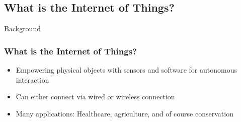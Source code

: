 \documentclass{beamer}
\begin{document}
\subsection{What is the Internet of Things?}

\begin{frame}{Background}
  \frametitle{What is the Internet of Things?}
  \begin{itemize}
    \item Empowering physical objects with sensors and software for autonomous interaction
    \item Can either connect via wired or wireless connection
    \item Many applications: Healthcare, agriculture, and of course conservation
  \end{itemize}
\end{frame}
\end{document}
